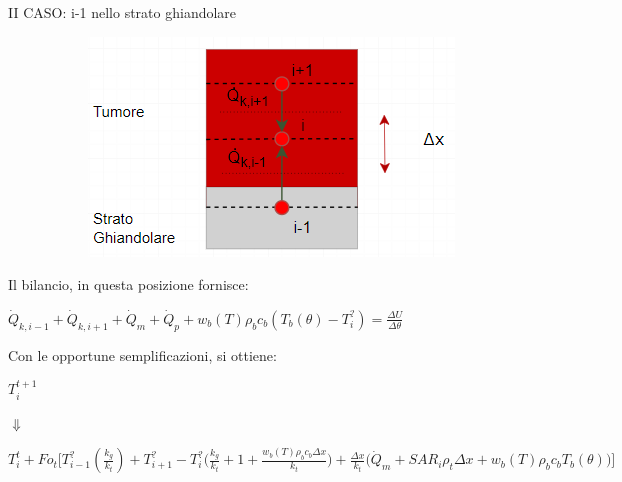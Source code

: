 \begin{description}
\item[II CASO: i-1 nello strato ghiandolare]

     \begin{figure}[H]
    \centering
    \includegraphics[width=.6\textwidth]{Immagini/Nodi/nodo14.2.png} 
    \label{nodo2}
\end{figure}
\end{description}
Il bilancio, in questa posizione fornisce:
\begin{center}
	$ \Dot{Q} _{k, i-1} +\Dot{Q} _{k, i+1}+ \Dot{Q} _{m} +\Dot{Q} _{p}+ w_b (T) \rho _b c_b (T_b(\theta)-T_i ^?)= \frac{\Delta U}{\Delta \theta} $
\end{center}
Con le opportune semplificazioni, si ottiene:
\begin{center}
	$T_i ^{t+1} $
\end{center}
\begin{center}
	$\Downarrow$
\end{center}
\begin{center}
	$T_i ^t + Fo_{t} \Bigg[ T_{i-1} ^? (\frac{k_{g}}{k_t}) + T_{i+1} ^?- T_i ^? \Big(\frac{k_{g}}{k_t} + 1 + \frac{ w_b (T) \rho _b c_b \Delta x }{k_{t}} \Big) + \frac{\Delta x }{k_{t}} \Big(\Dot{Q} _{m} +  SAR_i \rho _{t} \Delta x + w_b (T) \rho _b c_b T_b(\theta)\Big) \Bigg]$
\end{center}


